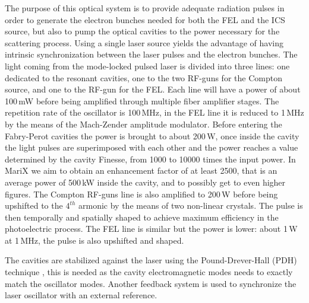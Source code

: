The purpose of this optical system is to provide adequate radiation pulses in order to generate the electron bunches needed for both the FEL and the ICS source, but also to pump the optical cavities to the power necessary for the scattering process. Using a single laser source yields the advantage of having intrinsic synchronization between the laser pulses and the electron bunches. The light coming from the mode-locked pulsed laser is divided into three lines: one dedicated to the resonant cavities, one to the two RF-guns for the Compton source, and one to the RF-gun for the FEL. Each line will have a power of about 100\,mW before being amplified through multiple fiber amplifier stages. The repetition rate of the oscillator is 100\,MHz, in the FEL line it is reduced to 1\,MHz by the means of the Mach-Zender amplitude modulator.
Before entering the Fabry-Perot cavities the power is brought to about 200\,W, once inside the cavity the light pulses are superimposed with each other and the power reaches a value determined by the cavity Finesse, from 1000 to 10000 times the input power. In MariX we aim to obtain an enhancement factor of at least 2500, that is an average power of 500\,kW inside the cavity, and to possibly get to even higher figures.
The Compton RF-guns line is also amplified to 200\,W before being upshifted to the $4^{th}$ armonic by the means of two non-linear crystals. The pulse is then temporally and spatially shaped to achieve maximum efficiency in the photoelectric process. The FEL line is similar but the power is lower: about 1\,W at 1\,MHz, the pulse is also upshifted and shaped.

The cavities are stabilized against the laser using the Pound-Drever-Hall (PDH) technique \parencite{Black2001}, this is needed as the cavity electromagnetic modes needs to exactly match the oscillator modes. Another feedback system is used to synchronize the laser oscillator with an external reference.

